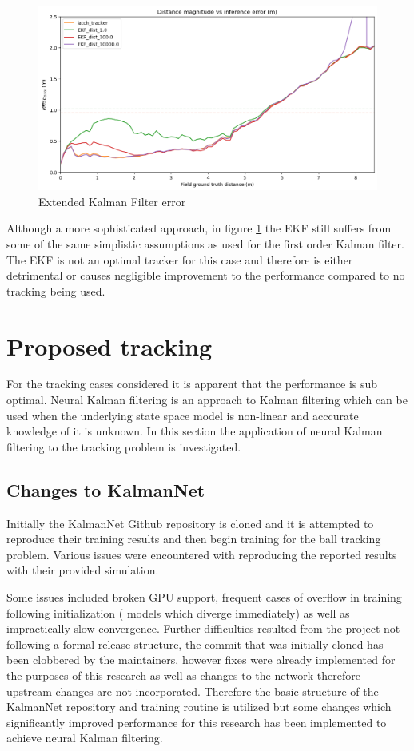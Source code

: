 \documentclass[a4paper,twoside,12pt]{report}
\begin{document}
\begin{figure}[h!]
\begin{center}
\includegraphics[width=12cm]{images/ekf_error.png}
\caption{Extended Kalman Filter error}
\label{fig:ekferror}
\end{center}
\end{figure}

Although a more sophisticated approach, in figure \ref{fig:ekferror} the EKF still suffers from some of the same simplistic assumptions as used for the first order Kalman filter. The EKF is not an optimal tracker for this case and therefore is either detrimental or causes negligible improvement to the performance compared to no tracking being used.

\newpage
\section{Proposed tracking}

For the tracking cases considered it is apparent that the performance is sub optimal. Neural Kalman filtering is an approach to Kalman filtering which can be used when the underlying state space model is non-linear and acccurate knowledge of it is unknown. In this section the application of neural Kalman filtering to the tracking problem is investigated.

\subsection{Changes to KalmanNet}

Initially the KalmanNet Github repository \cite{kalmangit} is cloned and it is attempted to reproduce their training results and then begin training for the ball tracking problem. Various issues were encountered with reproducing the reported results with their provided simulation. 

Some issues included broken GPU support, frequent cases of overflow in training following initialization ( models which diverge immediately) as well as impractically slow convergence. Further difficulties resulted from the project not following a formal release structure, the commit that was initially cloned has been clobbered by the maintainers, however fixes were already implemented for the purposes of this research as well as changes to the network therefore upstream changes are not incorporated. Therefore the basic structure of the KalmanNet repository and training routine is utilized but some changes which significantly improved performance for this research has been implemented to achieve neural Kalman filtering. 
\end{document}
